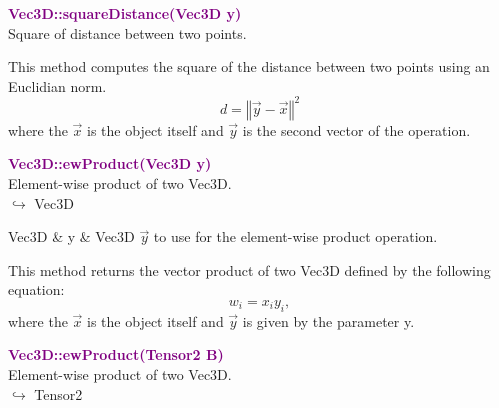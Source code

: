 \textcolor{purple}{\textbf{Vec3D::squareDistance(Vec3D y)}}\label{Vec3D::squareDistance(Vec3D y)}\\
Square of distance between two points.

This method computes the square of the distance between two points using an Euclidian norm.
\begin{equation*}
d = {\left\Vert \overrightarrow{y} - \overrightarrow{x} \right\Vert}^2
\end{equation*}
where the $\overrightarrow{x}$ is the object itself and $\overrightarrow{y}$ is the second vector of the operation.

\textcolor{purple}{\textbf{Vec3D::ewProduct(Vec3D y)}}\label{Vec3D::ewProduct(Vec3D y)}\\
Element-wise product of two Vec3D.\\ \hspace*{10mm}$\hookrightarrow$ Vec3D

\begin{tcolorbox}[width=\textwidth,myArgs,tabularx={ll|R}]
Vec3D & y & Vec3D $\overrightarrow{y}$ to use for the element-wise product operation.
\end{tcolorbox}

This method returns the vector product of two Vec3D defined by the following equation:
\begin{equation*}
w_i = x_i y_i,
\end{equation*}
where the $\overrightarrow{x}$ is the object itself and $\overrightarrow{y}$ is given by the parameter y.

\textcolor{purple}{\textbf{Vec3D::ewProduct(Tensor2 B)}}\label{Vec3D::ewProduct(Tensor2 B)}\\
Element-wise product of two Vec3D.\\ \hspace*{10mm}$\hookrightarrow$ Tensor2

